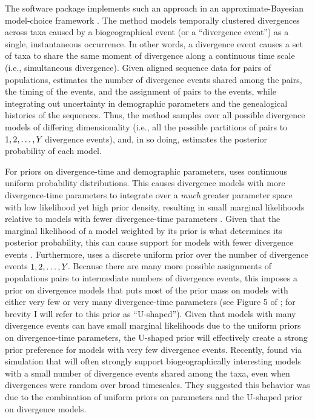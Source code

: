 The software package \msb implements such an approach in an
approximate-Bayesian model-choice framework \citep{Hickerson2006,Huang2011}.
The method models temporally clustered divergences across taxa caused by a
biogeographical event (or a ``divergence event'') as a single, instantaneous
occurrence.
In other words, a divergence event causes a set of taxa to share the same
moment of divergence along a continuous time scale (i.e., simultaneous
divergence).
Given aligned sequence data for \npairs{} pairs of populations, \msb 
estimates the number of divergence events shared among the pairs, the timing of
the events, and the assignment of pairs to the events, while integrating out
uncertainty in demographic parameters and the genealogical histories of the
sequences.
Thus, the method samples over all possible divergence models of differing
dimensionality (i.e., all the possible partitions of \npairs{} pairs to
$1,2,\ldots,Y_{}$ divergence events), and, in so doing, estimates
the posterior probability of each model.

For priors on divergence-time and demographic parameters, \msb uses continuous
uniform probability distributions.
This causes divergence models with more divergence-time parameters to integrate
over a \emph{much} greater parameter space with low likelihood yet high prior
density, resulting in small marginal likelihoods relative to models with fewer
divergence-time parameters \citep{Jeffreys1939,Lindley1957}.
Given that the marginal likelihood of a model weighted by its prior is what
determines its posterior probability, this can cause support for models with
fewer divergence events \citep{Oaks2012}.
Furthermore, \msb uses a discrete uniform prior over the number of divergence
events $1,2,\ldots,Y_{}$.
Because there are many more possible assignments of populations pairs to
intermediate numbers of divergence events, this imposes a prior on divergence
models that puts most of the prior mass on models with either very few or very
many divergence-time parameters (see Figure 5 of \citet{Oaks2012}; for brevity
I will refer to this prior as ``U-shaped'').
Given that models with many divergence events can have small marginal
likelihoods due to the uniform priors on divergence-time parameters, the
U-shaped prior will effectively create a strong prior preference for models
with very few divergence events.
Recently, \citet{Oaks2012} found via simulation that \msb will often strongly
support biogeographically interesting models with a small number of divergence
events shared among the taxa, even when divergences were random over broad
timescales.
They suggested this behavior was due to the combination of uniform priors on
parameters and the U-shaped prior on divergence models.

